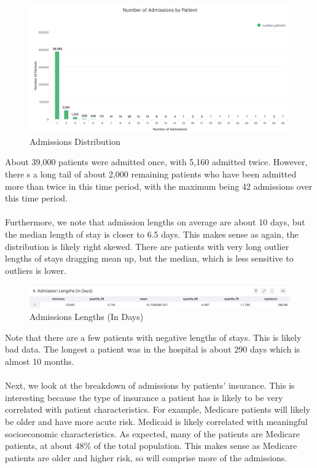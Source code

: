 \documentclass[12pt, final]{article}
\begin{document}
\begin{figure}[H]
\centering
\caption{Admissions Distribution}
\label{AdmissionsDistribution}
\includegraphics[page = {1}, scale = 0.4]{./images/admissions-distribution.png}
\end{figure}

About 39,000 patients were admitted once, with 5,160 admitted twice. However, there s a long tail of about 2,000 remaining patients who have been admitted more than twice in this time period, with the maximum being 42 admissions over this time period.
\\
\\
Furthermore, we note that admission lengths on average are about 10 days, but the median length of stay is closer to 6.5 days. This makes sense as again, the distribution is likely right skewed. There are patients with very long outlier lengths of stays dragging mean up, but the median, which is less sensitive to outliers is lower.

\begin{figure}[H]
\centering
\caption{Admissions Lengths (In Days)}
\label{AdmissionsLengths}
\includegraphics[page = {1}, scale = 0.4]{./images/admissions-lengths.png}
\end{figure}

Note that there are a few patients with negative lengths of stays. This is likely bad data. The longest a patient was in the hospital is about 290 days which is almost 10 months.
\\
\\
Next, we look at the breakdown of admissions by patients' insurance. This is interesting because the type of insurance a patient has is likely to be very correlated with patient characteristics. For example, Medicare patients will likely be older and have more acute risk. Medicaid is likely correlated with meaningful socioeconomic characteristics. As expected, many of the patients are Medicare patients, at about 48\% of the total population. This makes sense as Medicare patients are older and higher risk, so will comprise more of the admissions.
\end{document}
